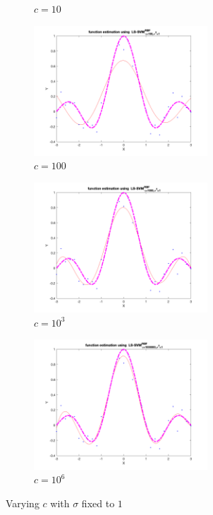 \documentclass[a4paper, 11pt, one column]{article}
\begin{document}
\begin{figure}[H]
\begin{subfigure}{0.33\linewidth}
            \caption{$c=10$}
        \end{subfigure}\hfil
        \begin{subfigure}{0.33\linewidth}
            \includegraphics[width=6.5cm]{images/sig1_gamma_100.png}
            \caption{$c=100$}
        \end{subfigure}\hfil
        \begin{subfigure}{0.33\linewidth}
            \includegraphics[width=6.5cm]{images/sig1_gamma_1000.png}
            \caption{$c=10^3$}
        \end{subfigure}\hfil
        \begin{subfigure}{0.33\linewidth}
            \includegraphics[width=6.5cm]{images/sig1_gamma_10^6.png}
            \caption{$c=10^6$}
        \end{subfigure}\hfil
        \caption{Varying $c$ with $\sigma$ fixed to $1$}
        \label{fig:sincfixsigma}
\end{figure}
\end{document}
